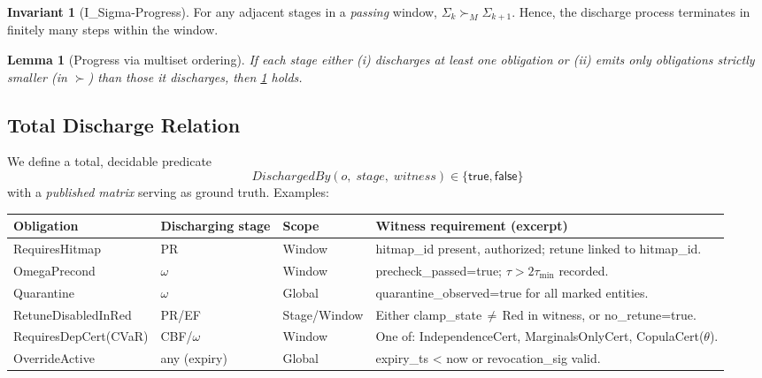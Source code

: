 \documentclass[11pt]{article}
\theoremstyle{plain}
\newtheorem{lemma}[theorem]{Lemma}
\theoremstyle{definition}
\newtheorem{invariant}[theorem]{Invariant}
\theoremstyle{remark}
\def\code#1{#1}%
\def\ISigma{I\_Sigma-Progress}%
\newcommand{\code}[1]{\texttt{\textup{#1}}}    %
\newcommand{\EF}{\textsc{EF}}
\newcommand{\PR}{\textsc{PR}}
\newcommand{\CBF}{\textsc{CBF}}
\newcommand{\om}{\ensuremath{\omega}}
\DeclareRobustCommand{\ISigma}{%
  \texorpdfstring{\textsc{I\_\ensuremath{\Sigma}-Progress}}{\textsc{I\_Sigma-Progress}}%
}
\def\code#1{#1}%
\begin{document}
\begin{invariant}[\ISigma]\label{inv:sigma-progress}
For any adjacent stages in a \emph{passing} window, $\Sigma_{k}\succ_M \Sigma_{k+1}$. Hence, the discharge process terminates in finitely many steps within the window.
\end{invariant}

\begin{lemma}[Progress via multiset ordering]\label{lem:progress}
If each stage either (i) discharges at least one obligation or (ii) emits only obligations strictly smaller (in $\succ$) than those it discharges, then \cref{inv:sigma-progress} holds.
\end{lemma}

\subsection{Total Discharge Relation}
We define a total, decidable predicate
\[
  \code{DischargedBy}(o,\; \textit{stage},\; \textit{witness}) \in \{\textsf{true},\textsf{false}\}
\]
with a \emph{published matrix} serving as ground truth. Examples:

\begin{center}
\renewcommand{\arraystretch}{1.15}
\begin{tabularx}{\linewidth}{@{}l l l X@{}}
\toprule
\textbf{Obligation} & \textbf{Discharging stage} & \textbf{Scope} & \textbf{Witness requirement (excerpt)} \\
\midrule
\code{RequiresHitmap} & \PR & Window &
\code{hitmap\_id} present, authorized; retune linked to \code{hitmap\_id}. \\
\code{OmegaPrecond} & \om & Window &
\code{precheck\_passed=true}; $\tau>2\tau_{\min}$ recorded. \\
\code{Quarantine} & \om & Global &
\code{quarantine\_observed=true} for all marked entities. \\
\code{RetuneDisabledInRed} & \PR/\EF & Stage/Window &
Either \code{clamp\_state}\,$\neq$\,\code{Red} in witness, or \code{no\_retune=true}. \\
\code{RequiresDepCert(CVaR)} & \CBF/\om & Window &
One of: \code{IndependenceCert}, \code{MarginalsOnlyCert}, \code{CopulaCert(}$\theta$\code{)}. \\
\code{OverrideActive} & any (expiry) & Global &
\code{expiry\_ts < now} or \code{revocation\_sig} valid. \\
\bottomrule
\end{tabularx}
\end{center}
\end{document}
